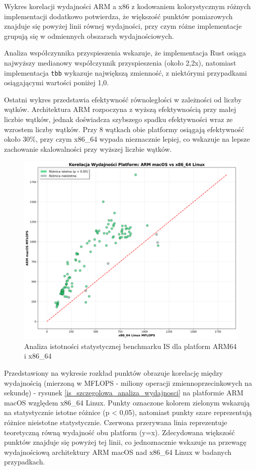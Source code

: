 Wykres korelacji wydajności ARM a x86 z kodowaniem kolorystycznym różnych implementacji dodatkowo potwierdza, że większość punktów pomiarowych znajduje się powyżej linii równej wydajności, przy czym różne implementacje grupują się w odmiennych obszarach wydajnościowych.

Analiza współczynnika przyspieszenia wskazuje, że implementacja Rust osiąga najwyższy medianowy współczynnik przyspieszenia (około 2,2x), natomiast implementacja \texttt{tbb} wykazuje największą zmienność, z niektórymi przypadkami osiągającymi wartości poniżej 1,0.

Ostatni wykres przedstawia efektywność równoległości w zależności od liczby wątków. Architektura ARM rozpoczyna z wyższą efektywnością przy małej liczbie wątków, jednak doświadcza szybszego spadku efektywności wraz ze wzrostem liczby wątków. Przy 8 wątkach obie platformy osiągają efektywność około 30\%, przy czym x86\_64 wypada nieznacznie lepiej, co wskazuje na lepsze zachowanie skalowalności przy wyższej liczbie wątków.
\begin{figure}[H]
    \centering
    \includegraphics[width=\textwidth]{analiza/images/parallel/is/compare/is_analiza_istotnosci_statystycznej.png}
    \caption{Analiza istotności statystycznej benchmarku IS dla platform ARM64 i x86\_64}
    \label{is_analiza_istotnosci_statystycznej}
\end{figure}
Przedstawiony na wykresie rozkład punktów obrazuje korelację między wydajnością (mierzoną w MFLOPS - miliony operacji zmiennoprzecinkowych na sekundę) - rysunek \ref{is_szczegolowa_analiza_wydajnosci} na platformie ARM macOS względem x86\_64 Linux. Punkty oznaczone kolorem zielonym wskazują na statystycznie istotne różnice (p < 0,05), natomiast punkty szare reprezentują różnice nieistotne statystycznie. Czerwona przerywana linia reprezentuje teoretyczną równą wydajność obu platform (y=x). Zdecydowana większość punktów znajduje się powyżej tej linii, co jednoznacznie wskazuje na przewagę wydajnościową architektury ARM macOS nad x86\_64 Linux w badanych przypadkach.

